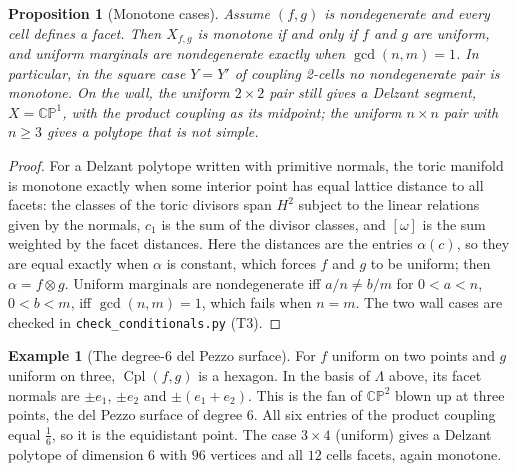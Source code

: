 \documentclass[11pt]{article}
\newtheorem{proposition}[theorem]{Proposition}
\theoremstyle{definition}
\newtheorem{example}[theorem]{Example}
\theoremstyle{remark}
\newcommand{\Cpl}{\operatorname{Cpl}}
\begin{document}
\begin{proposition}[Monotone cases]\label{prop:monotone}
Assume $(f,g)$ is nondegenerate and every cell defines a facet. Then $X_{f,g}$ is monotone if and only
if $f$ and $g$ are uniform, and uniform marginals are nondegenerate exactly when $\gcd(n,m)=1$. In
particular, in the square case $Y=Y'$ of coupling 2-cells no nondegenerate pair is monotone. On the
wall, the uniform $2\times2$ pair still gives a Delzant segment, $X=\mathbb{CP}^1$, with the product
coupling as its midpoint; the uniform $n\times n$ pair with $n\ge3$ gives a polytope that is not simple.
\end{proposition}
\begin{proof}
For a Delzant polytope written with primitive normals, the toric manifold is monotone exactly when
some interior point has equal lattice distance to all facets: the classes of the toric divisors span
$H^2$ subject to the linear relations given by the normals, $c_1$ is the sum of the divisor classes, and
$[\omega]$ is the sum weighted by the facet distances. Here the distances are the entries
$\alpha(c)$, so they are equal exactly when $\alpha$ is constant, which forces $f$ and $g$ to be
uniform; then $\alpha=f\otimes g$. Uniform marginals are nondegenerate iff $a/n\ne b/m$ for
$0<a<n$, $0<b<m$, iff $\gcd(n,m)=1$, which fails when $n=m$. The two wall cases are checked in
\texttt{check\_conditionals.py} (T3).
\end{proof}

\begin{example}[The degree-6 del Pezzo surface]\label{ex:dp6}
For $f$ uniform on two points and $g$ uniform on three, $\Cpl(f,g)$ is a hexagon. In the basis of
$\Lambda$ above, its facet normals are $\pm e_1$, $\pm e_2$ and $\pm(e_1+e_2)$. This is the fan of
$\mathbb{CP}^2$ blown up at three points, the del Pezzo surface of degree $6$. All six entries of the
product coupling equal $\tfrac16$, so it is the equidistant point. The case $3\times4$ (uniform) gives a
Delzant polytope of dimension $6$ with $96$ vertices and all $12$ cells facets, again monotone.
\end{example}
\end{document}
